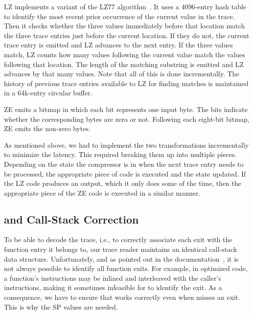 LZ implements a variant of the LZ77 algorithm~\cite{LZ}. It uses a 4096-entry hash table to identify the most recent prior occurrence of the current value in the trace. Then it checks whether the three values immediately before that location match the three trace entries just before the current location. If they do not, the current trace entry is emitted and LZ advances to the next entry. If the three values match, LZ counts how many values following the current value match the values following that location. The length of the matching substring is emitted and LZ advances by that many values. Note that all of this is done incrementally. The history of previous trace entries available to LZ for finding matches is maintained in a 64k-entry circular buffer. 

ZE emits a bitmap in which each bit represents one input byte. The bits indicate whether the corresponding bytes are zero or not. Following each eight-bit bitmap, ZE emits the non-zero bytes.

As mentioned above, we had to implement the two transformations incrementally to minimize the latency. This required breaking them up into multiple pieces. Depending on the state the compressor is in when the next trace entry needs to be processed, the appropriate piece of code is executed and the state updated. If the LZ code produces an output, which it only does some of the time, then the appropriate piece of the ZE code is executed in a similar manner.


\subsection{\pin and Call-Stack Correction}
\label{subsec:stack_cor}

To be able to decode the trace, i.e., to correctly associate each exit with the function entry it belongs to, our trace reader maintains an identical call-stack data structure. Unfortunately, and as pointed out in the \pin documentation~\cite{pinurl}, it is not always possible to identify all function exits. For example, in optimized code, a function's instructions may be inlined and interleaved with the caller's instructions, making it sometimes infeasible for \pin to identify the exit. As a consequence, we have to ensure that \parlot works correctly even when \pin misses an exit. This is why the SP values are needed.

